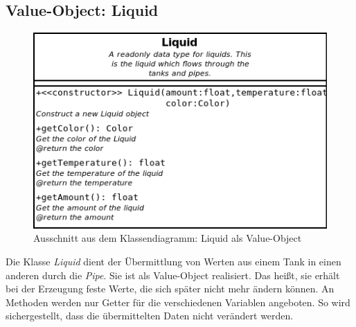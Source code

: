 \documentclass[parskip=full]{scrartcl}
\begin{document}
\subsection{Value-Object: Liquid}
\begin{figure}[H]
  \centering
  \includegraphics[scale=0.5]{design/pattern-screenshots/value-Liquid.png}
  \caption{Ausschnitt aus dem Klassendiagramm: Liquid als Value-Object}
\end{figure}
Die Klasse \emph{Liquid} dient der \"Ubermittlung von Werten aus einem Tank in einen anderen durch die \emph{Pipe}. Sie ist als Value-Object realisiert.
Das hei{\ss}t, sie erh\"alt bei der Erzeugung feste Werte, die sich sp\"ater nicht mehr \"andern k\"onnen. An Methoden werden nur Getter f\"ur die
verschiedenen Variablen angeboten. So wird sichergestellt, dass die \"ubermittelten Daten nicht ver\"andert werden.

\pagebreak
{}
{}
\listoffigures
\end{document}
